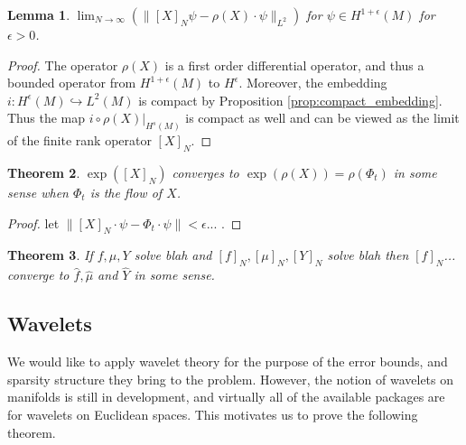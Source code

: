 \documentclass[12pt]{amsart}
\newtheorem{thm}{Theorem}[section]
\newtheorem{lem}[thm]{Lemma}
\begin{document}
\begin{lem}
	$\lim_{N \to \infty}( \| [X]_N \psi - \rho(X) \cdot \psi \|_{L^2} )$ for $\psi \in H^{1+\epsilon}(M)$ for $\epsilon> 0$.
\end{lem}
\begin{proof}
	The operator $\rho(X)$ is a first order differential operator, and thus a bounded operator from $H^{1+\epsilon}(M)$
	to $H^\epsilon$.
	Moreover, the embedding $i: H^{\epsilon}(M) \hookrightarrow L^2(M)$ is compact by Proposition \ref{prop:compact_embedding}.
	Thus the map $i \circ \rho(X) |_{H^s(M)}$ is compact as well and can be viewed as the limit of the finite rank operator $[X]_N$.
\end{proof}

\begin{thm}
	$\exp([X]_N)$ converges to $\exp( \rho(X) ) = \rho(\Phi_t)$ in some sense when $\Phi_t$ is the flow of $X$.
\end{thm}
\begin{proof}
	let $\| [X]_N \cdot \psi - \Phi_t  \cdot \psi \| < \epsilon$... .
\end{proof}

\begin{thm}
	If $f,\mu,Y$ solve blah and $[f]_N,[\mu]_N, [Y]_N$ solve blah
	then $[f]_N$... converge to $\hat{f},\hat{\mu}$ and $\widehat{Y}$ in some sense.
\end{thm}


\subsection{Wavelets}
\label{sec:wavelets}
We would like to apply wavelet theory for the purpose of the error bounds,
and sparsity structure they bring to the problem.
However, the notion of wavelets on manifolds is still in development,
and virtually all of the available packages are for wavelets on Euclidean spaces.
This motivates us to prove the following theorem.
\end{document}

